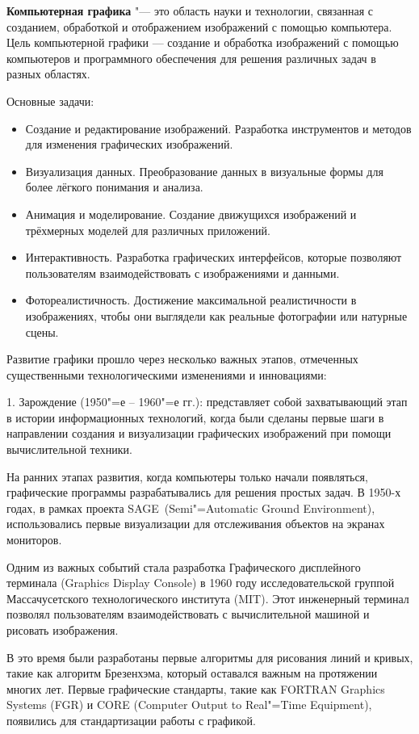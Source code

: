 \textbf{Компьютерная графика} "--- это область науки и технологии, связанная с созданием, обработкой и отображением изображений с помощью компьютера. Цель компьютерной графики — создание и обработка изображений с помощью компьютеров и программного обеспечения для решения различных задач в разных областях.

Основные задачи:
\begin{itemize}
    \item Создание и редактирование изображений. Разработка инструментов и методов для изменения графических изображений.  
    \item Визуализация данных. Преобразование данных в визуальные формы для более лёгкого понимания и анализа.  
    \item Анимация и моделирование. Создание движущихся изображений и трёхмерных моделей для различных приложений.  
    \item Интерактивность. Разработка графических интерфейсов, которые позволяют пользователям взаимодействовать с изображениями и данными.  
    \item Фотореалистичность. Достижение максимальной реалистичности в изображениях, чтобы они выглядели как реальные фотографии или натурные сцены.
\end{itemize}

Развитие графики прошло через несколько важных этапов, отмеченных существенными технологическими изменениями и инновациями:

1. Зарождение (1950"=е -- 1960"=е гг.): представляет собой захватывающий этап в истории информационных технологий, когда были сделаны первые шаги в направлении создания и визуализации графических изображений при помощи вычислительной техники.

На ранних этапах развития, когда компьютеры только начали появляться, графические программы разрабатывались для решения простых задач. В 1950-х годах, в рамках проекта \flqq SAGE\frqq\ (Semi"=Automatic Ground Environment), использовались первые визуализации для отслеживания объектов на экранах мониторов.

Одним из важных событий стала разработка Графического дисплейного терминала (Graphics Display Console) в 1960 году исследовательской группой Массачусетского технологического института (MIT). Этот инженерный терминал позволял пользователям взаимодействовать с вычислительной машиной и рисовать изображения.

В это время были разработаны первые алгоритмы для рисования линий и кривых, такие как алгоритм Брезенхэма, который оставался важным на протяжении многих лет. Первые графические стандарты, такие как FORTRAN Graphics Systems (FGR) и CORE (Computer Output to Real"=Time Equipment), появились для стандартизации работы с графикой.

